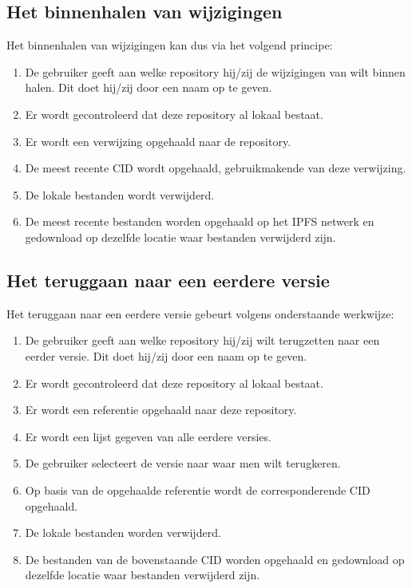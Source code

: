 \subsection{Het binnenhalen van wijzigingen}
Het binnenhalen van wijzigingen kan dus via het volgend principe:

\begin{enumerate}
\item De gebruiker geeft aan welke repository hij/zij de wijzigingen van wilt binnen halen. Dit doet hij/zij door een naam op te geven.
\item Er wordt gecontroleerd dat deze repository al lokaal bestaat.
\item Er wordt een verwijzing opgehaald naar de repository.
\item De meest recente CID wordt opgehaald, gebruikmakende van deze verwijzing.
\item De lokale bestanden wordt verwijderd.
\item De meest recente bestanden worden opgehaald op het IPFS netwerk en gedownload op dezelfde locatie waar bestanden verwijderd zijn.
\end{enumerate}
\subsection{Het teruggaan naar een eerdere versie}
Het teruggaan naar een eerdere versie gebeurt volgens onderstaande werkwijze:

\begin{enumerate}
\item De gebruiker geeft aan welke repository hij/zij wilt terugzetten naar een eerder versie. Dit doet hij/zij door een naam op te geven.
\item Er wordt gecontroleerd dat deze repository al lokaal bestaat.
\item Er wordt een referentie opgehaald naar deze repository.
\item Er wordt een lijst gegeven van alle eerdere versies.
\item De gebruiker selecteert de versie naar waar men wilt terugkeren.
\item Op basis van de opgehaalde referentie wordt de corresponderende CID opgehaald.
\item De lokale bestanden worden verwijderd.
\item De bestanden van de bovenstaande CID worden opgehaald en gedownload op dezelfde locatie waar bestanden verwijderd zijn.
\end{enumerate}